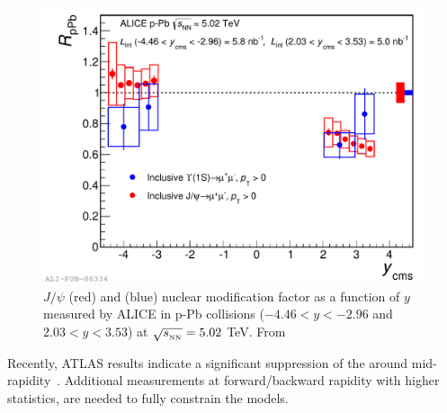 \begin{figure}[!t]
\begin{center}
\includegraphics[width=0.8\linewidth]{Chapters/Analysis/Figs/2014-Oct-08-RpPb_Ups_Jpsi_b.pdf}
\caption{$J/\psi$ (red) and \upsis (blue) nuclear modification factor as a function of $y$ measured by ALICE in p-Pb collisions ($-4.46<y<-2.96$ and $2.03<y<3.53$) at $\sqrt{s_{_{\rm NN}}}=5.02$ TeV. From \cite{Caffarri:2016xvd}}
\label{fig:ALICE_pPb_jpsi_upsi}
\end{center}
\end{figure}

Recently, ATLAS results indicate a significant suppression of the \upsis around mid-rapidity~\cite{Aaboud:2017cif}.  
Additional measurements at forward/backward rapidity with higher statistics, are needed to fully constrain the models.

